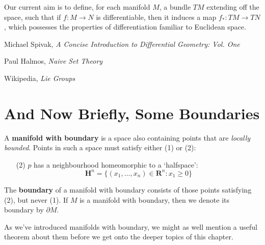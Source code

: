 Our current aim is to define, for each manifold $M$, a bundle $TM$ extending off the space, such that if $f:M \to N$ is differentiable, then it induces a map $f_*:TM \to TN$, which possesses the properties of differentiation familiar to Euclidean space.

\begin{thebibliography}{10}
     Michael Spivak,
    \emph{A Concise Introduction to Differential Geometry: Vol. One}

     Paul Halmos,
    \emph{Naive Set Theory}

     Wikipedia,
    \emph{Lie Groups}
\end{thebibliography}




\section{And Now Briefly, Some Boundaries}

\begin{definition}
    A {\bf manifold with boundary} is a space also containing points that are {\it locally bounded}. Points in such a space must satisfy either (1) or (2):
    \begin{enumerate}
        \item[(2)] $p$ has a neighbourhood homeomorphic to a `halfspace':
        \[ \mathbf{H}^n = \{ (x_1, \dots, x_n) \in \mathbf{R}^n: x_1 \geq 0 \} \]
    \end{enumerate}
    The {\bf boundary} of a manifold with boundary consists of those points satisfying (2), but never (1). If $M$ is a manifold with boundary, then we denote its boundary by $\partial M$.
\end{definition}

As we've introduced manifolds with boundary, we might as well mention a useful theorem about them before we get onto the deeper topics of this chapter.


